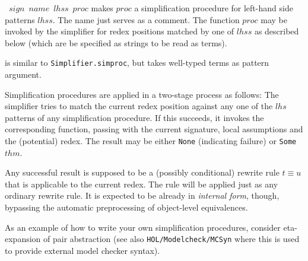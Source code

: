 \begin{ttdescription}
\item[\ttindexbold{Simplifier.simproc}~$sign$~$name$~$lhss$~$proc$] makes
  $proc$ a simplification procedure for left-hand side patterns $lhss$.  The
  name just serves as a comment.  The function $proc$ may be invoked by the
  simplifier for redex positions matched by one of $lhss$ as described below
  (which are be specified as strings to be read as terms).
  
\item[\ttindexbold{Simplifier.simproc_i}] is similar to
  \verb,Simplifier.simproc,, but takes well-typed terms as pattern argument.
\end{ttdescription}

Simplification procedures are applied in a two-stage process as
follows: The simplifier tries to match the current redex position
against any one of the $lhs$ patterns of any simplification procedure.
If this succeeds, it invokes the corresponding {\ML} function, passing
with the current signature, local assumptions and the (potential)
redex.  The result may be either \texttt{None} (indicating failure) or
\texttt{Some~$thm$}.

Any successful result is supposed to be a (possibly conditional)
rewrite rule $t \equiv u$ that is applicable to the current redex.
The rule will be applied just as any ordinary rewrite rule.  It is
expected to be already in \emph{internal form}, though, bypassing the
automatic preprocessing of object-level equivalences.

\medskip

As an example of how to write your own simplification procedures,
consider eta-expansion of pair abstraction (see also
\texttt{HOL/Modelcheck/MCSyn} where this is used to provide external
model checker syntax).
  
